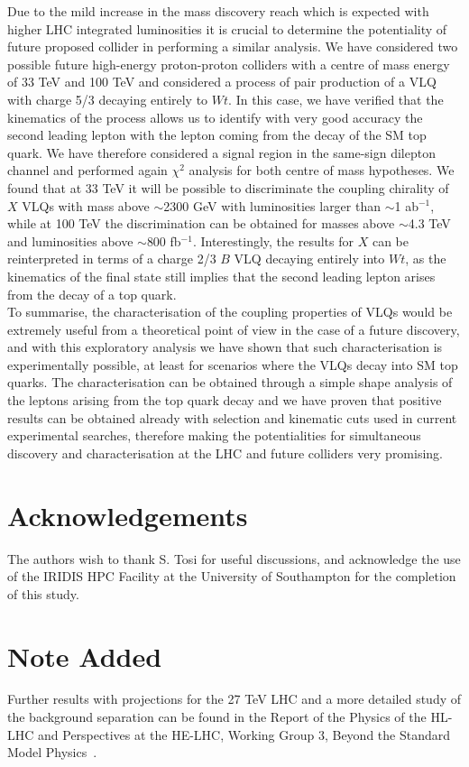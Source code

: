 \documentclass[a4paper]{article}
\begin{document}
Due to the mild increase in the mass discovery reach which is expected with higher LHC integrated luminosities it is crucial to determine the potentiality of future proposed collider in performing a similar analysis. We have considered two possible future high-energy proton-proton colliders with a centre of mass energy of 33 TeV and 100 TeV and considered a process of pair production of a VLQ with charge 5/3 decaying entirely to $Wt$. In this case, we have verified that the kinematics of the process allows us to identify with very good accuracy the second leading lepton with the lepton coming from the decay of the SM top quark. We have therefore considered a signal region in the same-sign dilepton channel and performed again $\chi^2$ analysis for both centre of mass hypotheses. We found that at 33 TeV it will be possible to discriminate the coupling chirality of $X$ VLQs with mass above $\sim$2300 GeV with luminosities larger than $\sim$1 ab$^{-1}$, while at 100 TeV the discrimination can be obtained for masses above $\sim$4.3 TeV and luminosities above
$\sim$800 fb$^{-1}$. Interestingly, the results for $X$ can be reinterpreted in terms of a charge 2/3 $B$ VLQ decaying entirely into $Wt$, as the kinematics of the final state still implies that the second leading lepton arises from the decay of a top quark.\\

To summarise, the characterisation of the coupling properties of VLQs would be extremely useful from a theoretical point of view in the case of a future discovery, and with this exploratory analysis we have shown that such characterisation is experimentally possible, at least for scenarios where the VLQs decay into SM top quarks. The characterisation can be obtained through a simple shape analysis of the leptons arising from the top quark decay and we have proven that positive results can be obtained already with selection and kinematic cuts used in current experimental searches, therefore making the potentialities for simultaneous discovery and characterisation at the LHC and future colliders very promising.


\section*{Acknowledgements}
The authors wish to thank S. Tosi for useful discussions, and acknowledge the use of the IRIDIS HPC Facility at the University of Southampton for the completion of this study.

\section*{Note Added}
Further results with projections for the 27 TeV LHC and a more detailed study of the background separation can be found in the Report of the Physics of the HL-LHC and Perspectives at the HE-LHC, Working Group 3, Beyond the Standard Model Physics~\cite{CidVidal:2018eel}.



\end{document}
